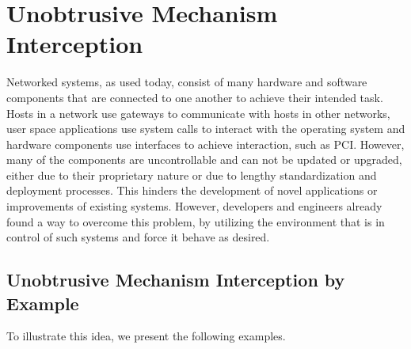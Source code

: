 \section{Unobtrusive Mechanism Interception}
\label{sec:design}

Networked systems, as used today, consist of many hardware and software components that are connected to one another to achieve their intended task.
Hosts in a network use gateways to communicate with hosts in other networks, user space applications use system calls to interact with the operating system and hardware components use interfaces to achieve interaction, such as PCI.
However, many of the components are uncontrollable and can not be updated or upgraded, either due to their proprietary nature or due to lengthy standardization and deployment processes.
This hinders the development of novel applications or improvements of existing systems.
However, developers and engineers already found a way to overcome this problem, by utilizing the environment that is in control of such systems and force it behave as desired.

\subsection{Unobtrusive Mechanism Interception by Example}
To illustrate this idea, we present the following examples.

